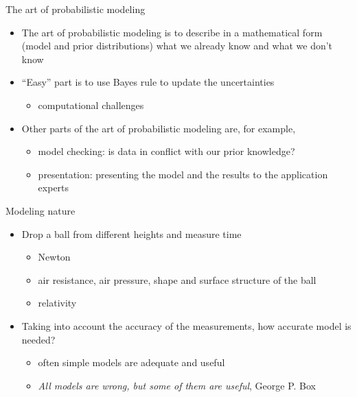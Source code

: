 \documentclass[english,t]{beamer}
\begin{document}


\begin{frame}{The art of probabilistic modeling}

  \begin{itemize}
  \item The art of probabilistic modeling is to describe in a
    mathematical form (model and prior distributions) what we already
    know and what we don't know 
\vspace{\baselineskip}
  \item<2-> ``Easy'' part is to use Bayes rule to update the uncertainties
    \begin{itemize}
    \item computational challenges
    \end{itemize}
\vspace{\baselineskip}
  \item<3-> Other parts of the art of probabilistic modeling are, for example,
    \begin{itemize}
    \item model checking: is data in conflict with our prior knowledge?
    \item presentation: presenting the model and the results to the application experts
    \end{itemize}
  \end{itemize}
\end{frame}

\begin{frame}{Modeling nature}

  \begin{itemize}
  \item Drop a ball from different heights and measure time
    \pause
    \begin{itemize}
    \item Newton
    \item air resistance, air pressure, shape and surface structure of the ball
    \item relativity
    \end{itemize}
    \pause
  \item Taking into account the accuracy of the measurements, how
    accurate model is needed?
    \pause
    \begin{itemize}
    \item often simple models are adequate and useful
    \item \emph{All models are wrong, but some of them are useful},
      George P. Box
    \end{itemize}
  \end{itemize}

\end{frame}
\end{document}
